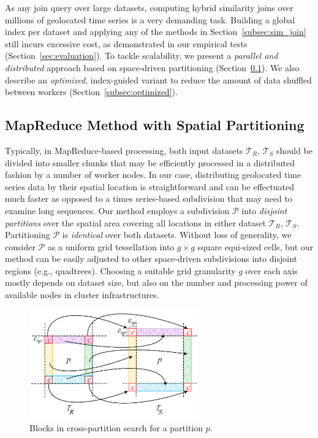 As any join query over large datasets, computing hybrid similarity joins over millions of geolocated time series is a very demanding task. Building a global index per dataset and applying any of the methods in Section~\ref{subsec:sim_join} still incurs excessive cost, as demonstrated in our empirical tests (Section~\ref{sec:evaluation}). To tackle scalability, we present a {\em parallel and distributed} approach based on space-driven partitioning (Section~\ref{subsec:partitioned}). We also describe an {\em optimized}, index-guided variant to reduce the amount of data shuffled between workers (Section~\ref{subsec:optimized}).

\subsection{MapReduce Method with Spatial Partitioning}
\label{subsec:partitioned}

Typically, in MapReduce-based processing, both input datasets $\mathcal{T}_{R}$, $\mathcal{T}_{S}$ should be divided into smaller chunks that may be efficiently processed in a distributed fashion by a number of worker nodes. In our case, distributing geolocated time series data by their spatial location is straightforward and can be effectuated much faster as opposed to a times series-based subdivision that may need to examine long sequences. Our method employs a subdivision $\mathcal{P}$ into {\em disjoint partitions} over the spatial area covering all locations in either dataset $\mathcal{T}_{R}$, $\mathcal{T}_{S}$. Partitioning $\mathcal{P}$ is {\em identical} over both datasets. Without loss of generality, we consider $\mathcal{P}$ as a uniform grid tessellation into $g \times g$ square equi-sized cells, but our method can be easily adjusted to other space-driven subdivisions into disjoint regions (e.g., quadtrees). Choosing a suitable grid granularity $g$ over each axis mostly depends on dataset size, but also on the number and processing power of available nodes in cluster infrastructures.

\begin{figure}[!tb]
 \centering
 \includegraphics[width=0.65\textwidth]{figures/grid_exchange_slices.png}
 \caption{Blocks in cross-partition search for a partition $p$.}
 \label{fig:blocks}
\end{figure}

